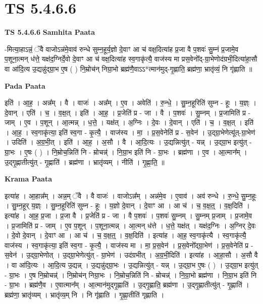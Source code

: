 \documentclass[17pt]{extarticle}
\begin{document}
\section{ TS 5.4.6.6 }

\textbf{TS 5.4.6.6 } \newline
\textbf{Samhita Paata} \newline

-मित्या॒हाऽन्नं॒ ॅवै वाजोऽन्न॑मे॒वाव॑ रुन्धे सुम्न॒हूर्य॒ज्ञो दे॒वाꣳ आ च॑ वक्ष॒दित्या॑ह प्र॒जा वै प॒शवः॑ सु॒म्नं प्र॒जामे॒व प॒शूना॒त्मन् ध॑त्ते॒ यक्ष॑द॒ग्निर्दे॒वो दे॒वाꣳ आ च॑ वक्ष॒दित्या॑ह स्व॒गाकृ॑त्यै॒ वाज॑स्य मा प्रस॒वेनो᳚द्-ग्रा॒भेणोद॑ग्रभी॒दित्या॑हा॒सौ वा आ॑दि॒त्य उ॒द्यन्नु॑द्ग्रा॒भ ए॒ष ( ) नि॒म्रोच॑न् निग्रा॒भो ब्रह्म॑णै॒वाऽऽ*त्मान॑मुद्-गृ॒ह्णाति॒ ब्रह्म॑णा॒ भ्रातृ॑व्यं॒ नि गृ॑ह्णाति ॥ \newline

\textbf{Pada Paata} \newline

इति॑ । आ॒ह॒ । अन्न᳚म् । वै । वाजः॑ । अन्न᳚म् । ए॒व । अवेति॑ । रु॒न्धे॒ । सु॒म्न॒हूरिति॑ सुम्न - हूः । य॒ज्ञ्ः । दे॒वान् । एति॑ । च॒ । व॒क्ष॒त् । इति॑ । आ॒ह॒ । प्र॒जेति॑ प्र - जा । वै । प॒शवः॑ । सु॒म्नम् । प्र॒जामिति॑ प्र - जाम् । ए॒व । प॒शून् । आ॒त्मन्न् । ध॒त्ते॒ । यक्ष॑त् । अ॒ग्निः । दे॒वः । दे॒वान् । एति॑ । च॒ । व॒क्ष॒त् । इति॑ । आ॒ह॒ । स्व॒गाकृ॑त्या॒ इति॑ स्व॒गा - कृ॒त्यै॒ । वाज॑स्य । मा॒ । प्र॒स॒वेनेति॑ प्र - स॒वेन॑ । उ॒द्ग्रा॒भेणेत्यू॑त्-ग्रा॒भेण॑ । उदिति॑ । अ॒ग्र॒भी॒त् । इति॑ । आ॒ह॒ । अ॒सौ । वै । आ॒दि॒त्यः । उ॒द्यन्नित्यु॑त् - यन्न् । उ॒द्ग्रा॒भ इत्यु॑त् - ग्रा॒भः । ए॒षः ( ) । नि॒म्रोच॒न्निति॑ नि - म्रोचन्न्॑ । नि॒ग्रा॒भ इति॑ नि - ग्रा॒भः । ब्रह्म॑णा । ए॒व । आ॒त्मान᳚म् । उ॒द्गृ॒ह्णातीत्यु॑त् - गृ॒ह्णाति॑ । ब्रह्म॑णा । भ्रातृ॑व्यम् । नीति॑ । गृ॒ह्णा॒ति॒ ॥  \newline


\textbf{Krama Paata} \newline

इत्या॑ह । आ॒हान्न᳚म् । अन्न॒म् ॅवै । वै वाजः॑ । वाजोऽन्न᳚म् । अन्न॑मे॒व । ए॒वाव॑ । अव॑ रुन्धे । रु॒न्धे॒ सु॒म्न॒हूः । सु॒म्न॒हूर् य॒ज्ञ्ः । सु॒म्न॒हूरिति॑ सुम्न - हूः । य॒ज्ञो दे॒वान् । दे॒वाꣳ आ । आ च॑ । च॒ व॒क्ष॒त्॒ । व॒क्ष॒दिति॑ । इत्या॑ह । आ॒ह॒ प्र॒जा । प्र॒जा वै । प्र॒जेति॑ प्र - जा । वै प॒शवः॑ । प॒शवः॑ सु॒म्नम् । सु॒म्नम् प्र॒जाम् । प्र॒जामे॒व । प्र॒जामिति॑ प्र - जाम् । ए॒व प॒शून् । प॒शूना॒त्मन्न् । आ॒त्मन् ध॑त्ते । ध॒त्ते॒ यक्ष॑त् । यक्ष॑द॒ग्निः । अ॒ग्निर् दे॒वः । दे॒वो दे॒वान् । दे॒वाꣳ आ । आ च॑ । च॒ व॒क्ष॒त्॒ । व॒क्ष॒दिति॑ । इत्या॑ह । आ॒ह॒ स्व॒गाकृ॑त्यै । स्व॒गाकृ॑त्यै॒ वाज॑स्य । स्व॒गाकृ॑त्या॒ इति॑ स्व॒गा - कृ॒त्यै॒ । वाज॑स्य मा । मा॒ प्र॒स॒वेन॑ । प्र॒स॒वेनो᳚द्ग्रा॒भेण॑ । प्र॒स॒वेनेति॑ प्र - स॒वेन॑ । उ॒द्ग्रा॒भेणोत् । उ॒द्ग्रा॒भेणेत्यु॑त् - ग्रा॒भेण॑ । उद॑ग्रभीत् । अ॒ग्र॒भी॒दिति॑ । इत्या॑ह । आ॒हा॒सौ । अ॒सौ वै । वा आ॑दि॒त्यः । आ॒दि॒त्य उ॒द्यन्न् । उ॒द्यन्नु॑द्ग्रा॒भः । उ॒द्यन्नित्यु॑त् - यन्न् । उ॒द्ग्रा॒भ ए॒षः ( ) । उ॒द्ग्रा॒भ इत्यु॑त् - ग्रा॒भः । ए॒ष नि॒म्रोचन्न्॑ । नि॒म्रोच॑न् निग्रा॒भः । नि॒म्रोच॒न्निति॑ नि - म्रोचन्न्॑ । नि॒ग्रा॒भो ब्रह्म॑णा । नि॒ग्रा॒भ इति॑ नि - ग्रा॒भः । ब्रह्म॑णै॒व । ए॒वात्मान᳚म् । आ॒त्मान॑मुद्गृ॒ह्णाति॑ । उ॒द्गृ॒ह्णाति॒ ब्रह्म॑णा । उ॒द्गृ॒ह्णातीत्यु॑त् - गृ॒ह्णाति॑ । ब्रह्म॑णा॒ भ्रातृ॑व्यम् । भ्रातृ॑व्य॒म् नि । नि गृ॑ह्णाति । गृ॒ह्णा॒तीति॑ गृह्णाति । \newline
\end{document}
